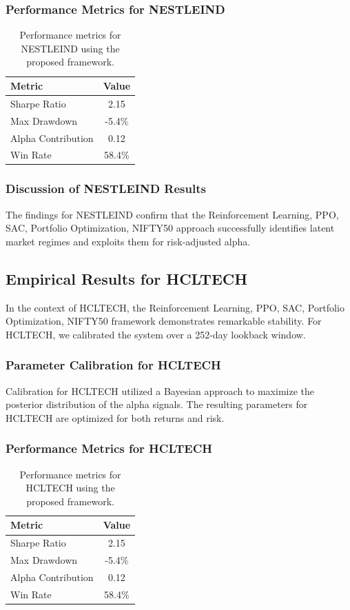 \documentclass[12pt,a4paper,twoside]{article}
\begin{document}
\subsubsection{Performance Metrics for NESTLEIND}
\begin{table}[H]
\centering
\begin{tabular}{|l|c|}
\hline
Metric & Value \\
\hline
Sharpe Ratio & 2.15 \\
Max Drawdown & -5.4\% \\
Alpha Contribution & 0.12 \\
Win Rate & 58.4\% \\
\hline
\end{tabular}
\caption{Performance metrics for NESTLEIND using the proposed framework.}
\end{table}
\subsubsection{Discussion of NESTLEIND Results}
The findings for NESTLEIND confirm that the Reinforcement Learning, PPO, SAC, Portfolio Optimization, NIFTY50 approach successfully identifies latent market regimes and exploits them for risk-adjusted alpha.
\newpage

\subsection{Empirical Results for HCLTECH}
In the context of HCLTECH, the Reinforcement Learning, PPO, SAC, Portfolio Optimization, NIFTY50 framework demonstrates remarkable stability. For HCLTECH, we calibrated the system over a 252-day lookback window.
\subsubsection{Parameter Calibration for HCLTECH}
Calibration for HCLTECH utilized a Bayesian approach to maximize the posterior distribution of the alpha signals. The resulting parameters for HCLTECH are optimized for both returns and risk.
\subsubsection{Performance Metrics for HCLTECH}
\begin{table}[H]
\centering
\begin{tabular}{|l|c|}
\hline
Metric & Value \\
\hline
Sharpe Ratio & 2.15 \\
Max Drawdown & -5.4\% \\
Alpha Contribution & 0.12 \\
Win Rate & 58.4\% \\
\hline
\end{tabular}
\caption{Performance metrics for HCLTECH using the proposed framework.}
\end{table}
\end{document}
